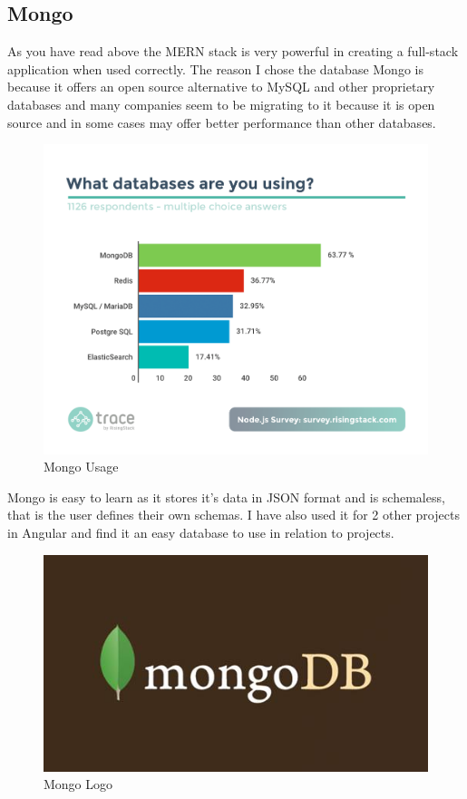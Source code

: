 \subsection{Mongo}
As you have read above the MERN stack is very powerful in creating a full-stack
application when used correctly.  The reason I chose the database Mongo is because
it offers an open source alternative to MySQL and other proprietary databases
\cite{Mongo}
and many companies seem to be migrating to it because it is open source and in
some cases may offer better performance than other databases.
\begin{figure}[h!]
  \includegraphics[width=\textwidth]{img/mongostat.png}
  \caption{Mongo Usage}
  \label{fig: Mongo usage statistics}
\end{figure}
\cite{Survey}
Mongo is easy to learn as it stores it's data in JSON format and is schemaless, that is the user
defines their own schemas. I have also used it for 2 other projects in Angular and find it an
easy database to use in relation to projects.
\begin{figure}[ht]
  \includegraphics[width=\textwidth]{img/mongo.jpg}
  \caption{Mongo Logo}
  \label{fig: Image of Mongo Logo}
\end{figure} \cite{MongoImage}
\\

